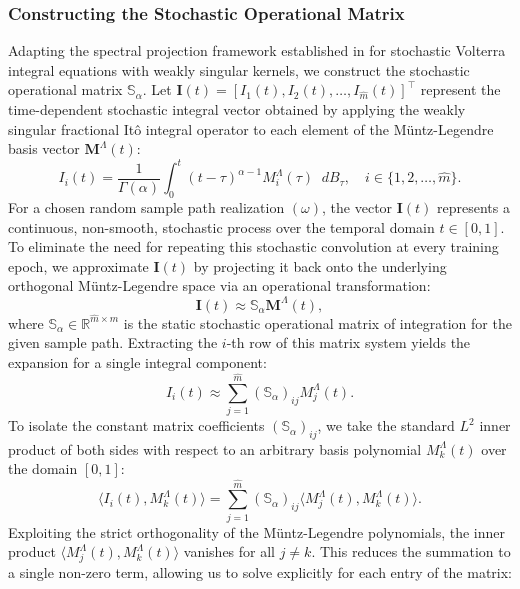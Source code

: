 \documentclass[11pt, a4paper]{article}
\theoremstyle{theoremstyle}
\theoremstyle{definitionstyle}
\newcommand{\dd}{\mathop{}\!d}
\begin{document}
\subsubsection{Constructing the Stochastic Operational Matrix}\label{sec:stoch_op}
Adapting the spectral projection framework established in \cite[Section 3]{gupta2025operational} for stochastic Volterra integral equations with weakly singular kernels, we construct the stochastic operational matrix \( \mathbb{S}_\alpha \). Let \( \mathbf{I}(t) = [I_1(t), I_2(t), \dots, I_{\hat m}(t)]^\top \) represent the time-dependent stochastic integral vector obtained by applying the weakly singular fractional Itô integral operator to each element of the M\"untz-Legendre basis vector \( \mathbf{M}^\Lambda(t) \):
\begin{equation} I_i(t) = \frac{1}{\Gamma(\alpha)} \int_0^t (t-\tau)^{\alpha-1} M_i^\Lambda(\tau) \dd{B_\tau}, \quad i \in \{1, 2, \dots, \hat m\}. \end{equation}
For a chosen random sample path realization \( (\omega) \), the vector \( \mathbf{I}(t) \) represents a continuous, non-smooth, stochastic process over the temporal domain \( t \in [0,1] \). To eliminate the need for repeating this stochastic convolution at every training epoch, we approximate \( \mathbf{I}(t) \) by projecting it back onto the underlying orthogonal M\"untz-Legendre space via an operational transformation:
\begin{equation} \mathbf{I}(t) \approx \mathbb{S}_\alpha \mathbf{M}^\Lambda(t), \end{equation}
where \( \mathbb{S}_\alpha \in \mathbb{R}^{\hat m \times \hat m} \) is the static stochastic operational matrix of integration for the given sample path. Extracting the \( i \)-th row of this matrix system yields the expansion for a single integral component:
\begin{equation} I_i(t) \approx \sum_{j=1}^{\hat m} (\mathbb{S}_\alpha)_{ij} M_j^\Lambda(t). \end{equation}
To isolate the constant matrix coefficients \( (\mathbb{S}_\alpha)_{ij} \), we take the standard \( L^2 \) inner product of both sides with respect to an arbitrary basis polynomial \( M_k^\Lambda(t) \) over the domain \( [0, 1] \):
\begin{equation} \langle I_i(t), M_k^\Lambda(t) \rangle = \sum_{j=1}^{\hat m} (\mathbb{S}_\alpha)_{ij} \langle M_j^\Lambda(t), M_k^\Lambda(t) \rangle. \end{equation}
Exploiting the strict orthogonality of the M\"untz-Legendre polynomials, the inner product \( \langle M_j^\Lambda(t), M_k^\Lambda(t) \rangle \) vanishes for all \( j \neq k \). This reduces the summation to a single non-zero term, allowing us to solve explicitly for each entry of the matrix:
\end{document}
